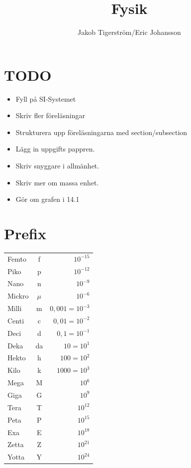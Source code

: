 \documentclass[a4paper,11pt]{article}
\title{Fysik}
\author{Jakob Tigerström/Eric Johansson}
\begin{document}
\maketitle
\tableofcontents
\newpage
\begin{flushleft}
\section{TODO}
\begin{itemize}
  \item Fyll på SI-Systemet
  \item Skriv fler föreläsningar
  \item Strukturera upp föreläsningarna med section/subsection
  \item Lägg in uppgifts pappren.
  \item Skriv snyggare i allmänhet.
  \item Skriv mer om massa enhet.
  \item Gör om grafen i 14.1
\end{itemize}
\section{Prefix}

\begin{tabular}{l c r}
  Femto & f & $ 10^{-15} $\\ 
  Piko & p & $ 10^{-12} $\\ 
  Nano & n & $ 10^{-9} $\\ 
  Mickro & $ \mu $ & $ 10^{-6} $\\ 
  Milli & m & $ 0,001 = 10^{-3} $\\
  Centi & c & $ 0,01 = 10^{-2} $\\
  Deci & d & $ 0,1 = 10^{-1}$\\
  Deka & da & $ 10 = 10^1 $\\
  Hekto & h & $ 100 = 10^2 $\\
  Kilo & k & $ 1000 = 10^3 $\\
  Mega & M & $ 10^6 $\\
  Giga & G & $ 10^9 $\\
  Tera & T & $ 10^{12} $\\
  Peta & P & $ 10^{15} $\\
  Exa & E & $ 10^{18} $\\
  Zetta & Z & $ 10^{21} $\\
  Yotta & Y & $ 10^{24} $\\
\end{tabular}
\newpage

\end{flushleft}
\end{document}
